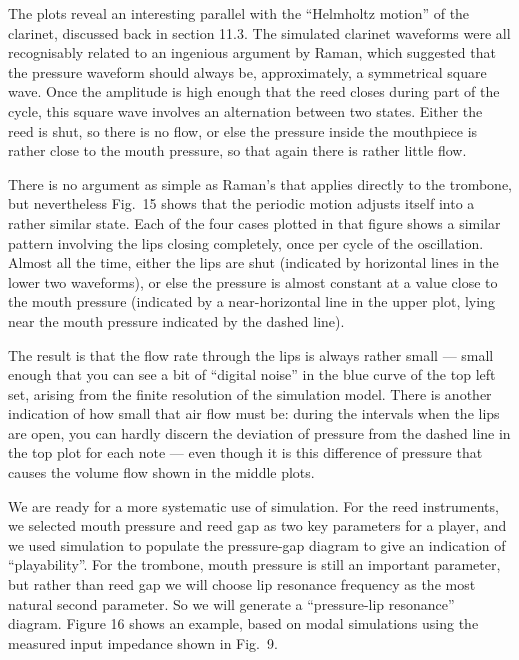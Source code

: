 



  The plots reveal an interesting parallel with the ``Helmholtz motion'' of the 
  clarinet, discussed back in section 11.3. The simulated clarinet waveforms 
  were all recognisably related to an ingenious argument by Raman, which 
  suggested that the pressure waveform should always be, approximately, a 
  symmetrical square wave. Once the amplitude is high enough that the reed 
  closes during part of the cycle, this square wave involves an alternation 
  between two states. Either the reed is shut, so there is no flow, or else the 
  pressure inside the mouthpiece is rather close to the mouth pressure, so that 
  again there is rather little flow. 

  There is no argument as simple as Raman’s that applies directly to the 
  trombone, but nevertheless Fig.\ 15 shows that the periodic motion adjusts 
  itself into a rather similar state. Each of the four cases plotted in that 
  figure shows a similar pattern involving the lips closing completely, once 
  per cycle of the oscillation. Almost all the time, either the lips are shut 
  (indicated by horizontal lines in the lower two waveforms), or else the 
  pressure is almost constant at a value close to the mouth pressure (indicated 
  by a near-horizontal line in the upper plot, lying near the mouth pressure 
  indicated by the dashed line). 

  The result is that the flow rate through the lips is always rather small — 
  small enough that you can see a bit of “digital noise” in the blue curve of 
  the top left set, arising from the finite resolution of the simulation model. 
  There is another indication of how small that air flow must be: during the 
  intervals when the lips are open, you can hardly discern the deviation of 
  pressure from the dashed line in the top plot for each note --- even though 
  it is this difference of pressure that causes the volume flow shown in the 
  middle plots. 

  We are ready for a more systematic use of simulation. For the reed 
  instruments, we selected mouth pressure and reed gap as two key parameters 
  for a player, and we used simulation to populate the pressure-gap diagram to 
  give an indication of “playability”. For the trombone, mouth pressure is 
  still an important parameter, but rather than reed gap we will choose lip 
  resonance frequency as the most natural second parameter. So we will generate 
  a “pressure-lip resonance” diagram. Figure 16 shows an example, based on 
  modal simulations using the measured input impedance shown in Fig.\ 9. 

